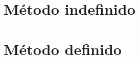 


\section{M\'{e}todo indefinido}\label{sec:metodoindefinido}

\section{M\'{e}todo definido}\label{sec:metododefinido}


